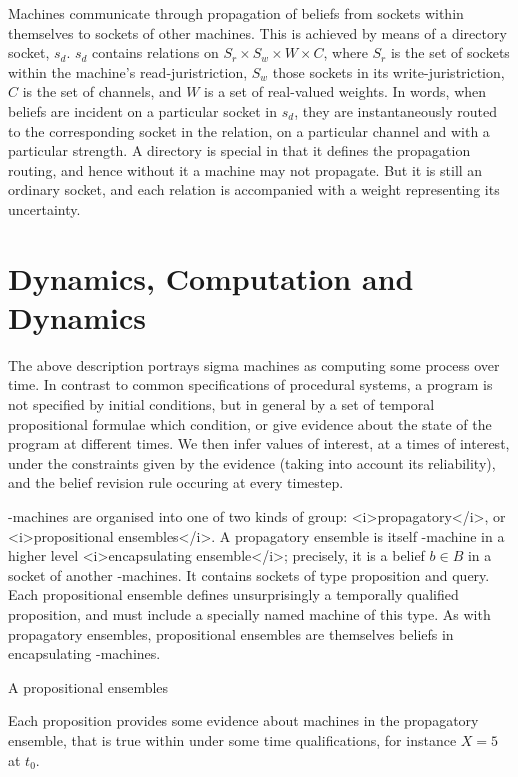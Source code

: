 Machines communicate through propagation of beliefs from sockets within themselves to sockets of other machines.
This is achieved by means of a directory socket, $s_d$.
$s_d$ contains relations on $S_r \times S_w \times W \times C$, where $S_r$ is the set of sockets within the machine's read-juristriction, $S_w$ those sockets in its write-juristriction, $C$ is the set of channels, and $W$ is a set of real-valued weights.
In words, when beliefs are incident on a particular socket in $s_d$, they are instantaneously routed to the corresponding socket in the relation, on a particular channel and with a particular strength.
A directory is special in that it defines the propagation routing, and hence without it a machine may not propagate.
But it is still an ordinary socket, and each relation is accompanied with a weight representing its uncertainty.

\section{Dynamics, Computation and Dynamics}

The above description portrays sigma machines as computing some process over time.
In contrast to common specifications of procedural systems, a program is not specified by initial conditions, but in general by a set of temporal propositional formulae which condition, or give evidence about the state of the program at different times.
We then infer values of interest, at a times of interest, under the constraints given by the evidence (taking into account its reliability), and the belief revision rule occuring at every timestep.

\sigma-machines are organised into one of two kinds of group: <i>propagatory</i>, or <i>propositional ensembles</i>.
A propagatory ensemble is itself \sigma-machine in a higher level <i>encapsulating ensemble</i>; precisely, it is a belief $b \in B$ in a socket of another \sigma-machines.
It contains sockets of type proposition and query.
Each propositional ensemble defines unsurprisingly a temporally qualified proposition, and  must include a specially named machine of this type.
As with propagatory ensembles, propositional ensembles are themselves beliefs in encapsulating \sigma-machines.

A propositional ensembles

Each proposition provides some evidence about machines in the propagatory ensemble, that is true within under some time qualifications, for instance $X=5$ at $t_0$.

